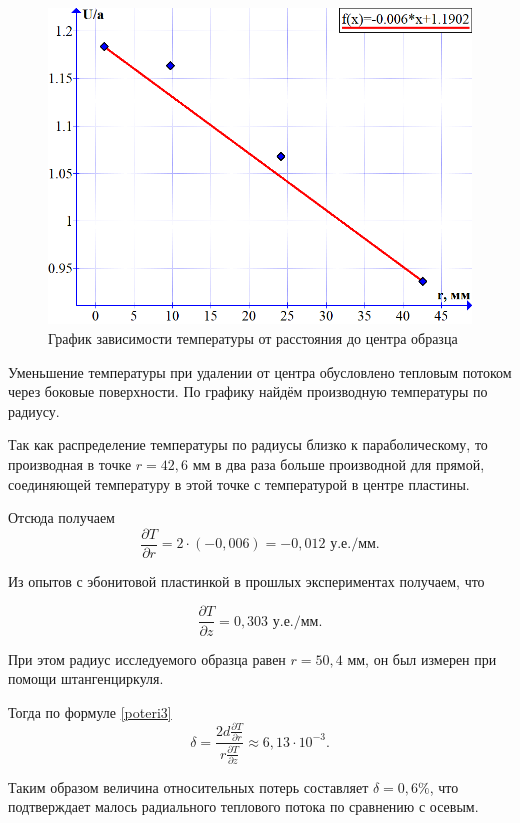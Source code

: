 \documentclass[a4paper,12pt]{article} %
\begin{document}
\begin{figure}[H]
	\begin{center}
		\includegraphics[width=17cm]{gr2.png}
		\caption{График зависимости температуры от расстояния до центра образца}\label{img:gr2}
	\end{center}
\end{figure}

Уменьшение температуры при удалении от центра обусловлено тепловым потоком через боковые поверхности. По графику найдём производную температуры по радиусу.

Так как распределение температуры по радиусы близко к параболическому, то производная в точке $ r = 42,6 $ мм в два раза больше производной для прямой, соединяющей температуру в этой точке с температурой в центре пластины.

Отсюда получаем \[ \frac{\partial T}{\partial r} = 2 \cdot (-0,006) = -0,012 \text{ у.е./мм}. \]

Из опытов с эбонитовой пластинкой в прошлых экспериментах получаем, что

\[ \frac{\partial T}{\partial z} = 0,303 \text{ у.е./мм}. \]

При этом радиус исследуемого образца равен $r = 50,4 $ мм, он был измерен при помощи штангенциркуля.

Тогда по формуле \eqref{poteri3} \[ \delta = \frac{2d \frac{\partial T}{\partial r}}{r \frac{\partial T}{\partial z}}  \approx 6,13 \cdot 10^{-3}. \]

Таким образом величина относительных потерь составляет $ \delta = 0,6 \%$, что подтверждает малось радиального теплового потока по сравнению с осевым.
\end{document}

